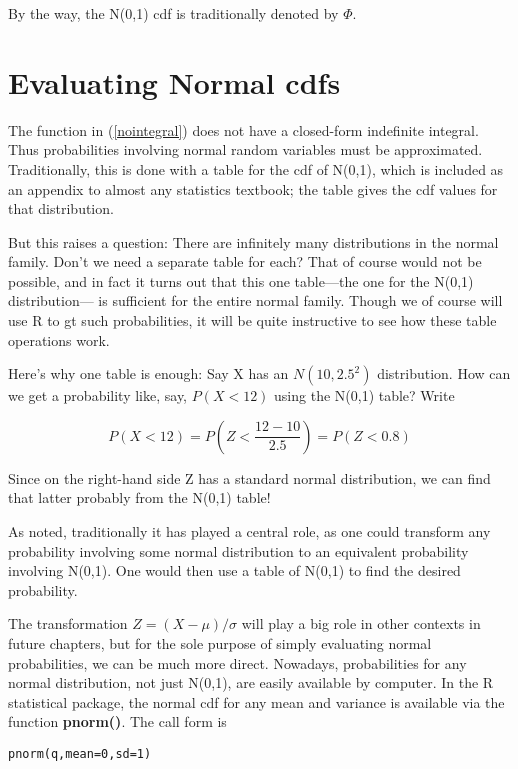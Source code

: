 By the way, the N(0,1) cdf is traditionally denoted by $\Phi$.  

\section{Evaluating Normal cdfs}

The function in (\ref{nointegral}) does not have a closed-form
indefinite integral.  Thus probabilities involving normal random
variables must be approximated.  Traditionally, this is done with a
table for the cdf of N(0,1), which is included as an appendix to almost
any statistics textbook; the table gives the cdf values for that
distribution.

But this raises a question:  There are infinitely many distributions in
the normal family.  Don't we need a separate table for each?  That of
course would not be possible, and in fact it turns out that this one
table---the one for the N(0,1) distribution--- is sufficient for the
entire normal family.  Though we of course will use R to gt such
probabilities, it will be quite instructive to see how these table
operations work.

Here's why one table is enough: Say X has an $N(10,2.5^2)$ distribution.
How can we get a probability like, say, $P(X < 12)$ using the N(0,1)
table?  Write

\begin{equation}
P(X < 12) = P\left (Z < \frac{12-10}{2.5}\right ) = P(Z < 0.8)
\end{equation}

Since on the right-hand side Z has a standard normal distribution,
we can find that latter probably from the N(0,1) table!



As noted, traditionally it has played a central role, as one could
transform any probability involving some normal distribution to an
equivalent probability involving N(0,1).  One would then use a table of
N(0,1) to find the desired probability.

The transformation $Z = (X - \mu)/\sigma$ will play a big role in other
contexts in future chapters, but for the sole purpose of simply
evaluating normal probabilities, we can be much more direct.  Nowadays,
probabilities for any normal distribution, not just N(0,1), are easily
available by computer.  In the R statistical package, the normal cdf for
any mean and variance is available via the function {\bf pnorm()}.  The
call form is

\begin{Verbatim}[fontsize=\relsize{-2}]
pnorm(q,mean=0,sd=1)
\end{Verbatim}

